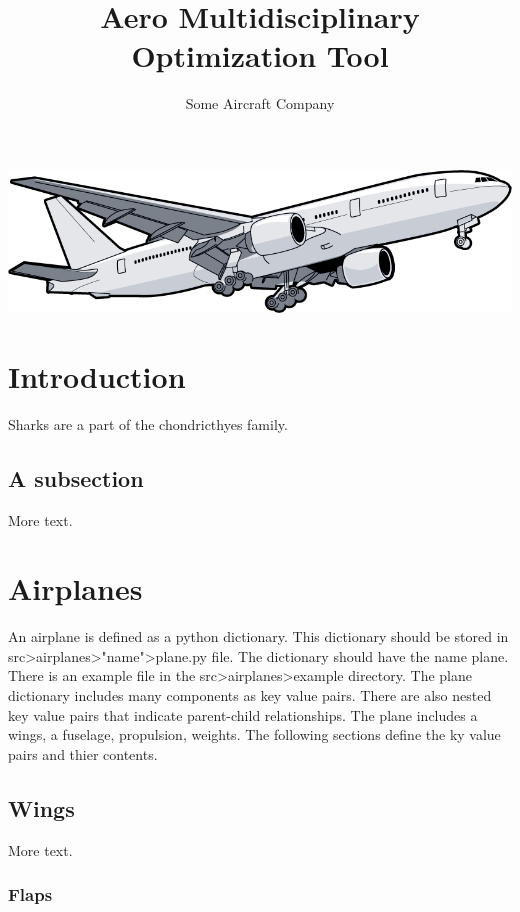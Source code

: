 \documentclass[11pt]{article} %
\title{Aero Multidisciplinary Optimization Tool}
\author{Some Aircraft Company}
\begin{document}
\maketitle
\begin{center}
    \includegraphics[width=1.1\textwidth]{cover}
\end{center}

\pagebreak

\tableofcontents
 
\pagebreak

\section{Introduction}

Sharks are a part of the chondricthyes family.

\subsection{A subsection}

More text.

\section{Airplanes}

An airplane is defined as a python dictionary. This dictionary should be stored in src>airplanes>"name">plane.py file. The dictionary should have the name plane. There is an example file in the src>airplanes>example directory. The plane dictionary includes many components as key value pairs. There are also nested key value pairs that indicate parent-child relationships. The plane includes a wings, a fuselage, propulsion, weights. The following sections define the ky value pairs and thier contents.

\subsection{Wings}

More text.

\subsubsection{Flaps}
\end{document}
